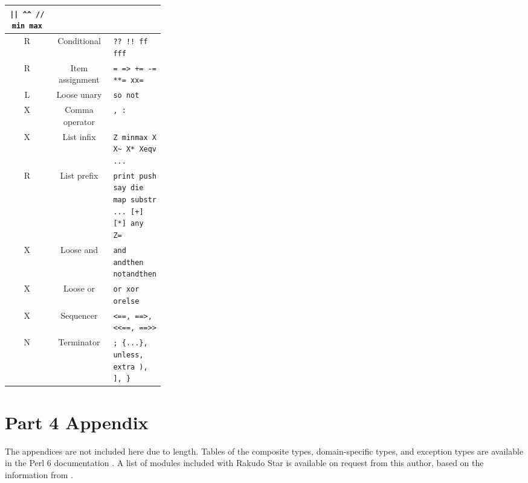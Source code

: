 \documentclass[14pt,english]{extarticle}
\providecommand{\tabularnewline}{\\}
\begin{document}
\begin{longtable}{|c|c|>{\centering}p{0.3\linewidth}|}
\texttt{\small{}|| \textasciicircum{}\textasciicircum{} // min max}\tabularnewline
\hline 
{\small{}R} &
{\small{}Conditional } &
\texttt{\small{}?? !! ff fff}\tabularnewline
\hline 
{\small{}R} &
{\small{}Item assignment } &
\texttt{\small{}= => += -= {*}{*}= xx=}\tabularnewline
\hline 
{\small{}L} &
{\small{}Loose unary } &
\texttt{\small{}so not}\tabularnewline
\hline 
{\small{}X} &
{\small{}Comma operator } &
\texttt{\small{}, :}\tabularnewline
\hline 
{\small{}X} &
{\small{}List infix } &
\texttt{\small{}Z minmax X X\textasciitilde{} X{*} Xeqv ...}\tabularnewline
\hline 
{\small{}R} &
{\small{}List prefix } &
\texttt{\small{}print push say die map substr ... {[}+{]} {[}{*}{]}
any Z=}\tabularnewline
\hline 
{\small{}X} &
{\small{}Loose and } &
\texttt{\small{}and andthen notandthen}\tabularnewline
\hline 
{\small{}X} &
{\small{}Loose or } &
\texttt{\small{}or xor orelse}\tabularnewline
\hline 
{\small{}X} &
{\small{}Sequencer } &
\texttt{\small{}<==, ==>, <\textcompwordmark{}<==, ==>\textcompwordmark{}>}\tabularnewline
\hline 
{\small{}N} &
{\small{}Terminator } &
\texttt{\small{}; \{...\}, unless, extra ), {]}, \}}\tabularnewline
\hline 
\end{longtable}{\scriptsize \par}


\section*{Part 4 Appendix}

The appendices are not included here due to length. Tables of the
composite types, domain-specific types, and exception types are available
in the Perl 6 documentation \cite{Documentation}. A list of modules
included with Rakudo Star is available on request from this author,
based on the information from \cite{New1}.
\end{document}
